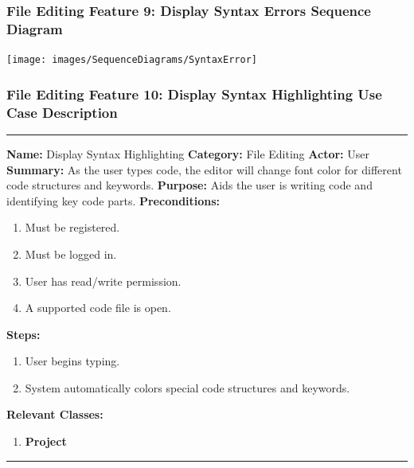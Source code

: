 \documentclass[twoside,letterpaper]{article}
\begin{document}
\subsubsection[File Editing Feature 9: Display Syntax Errors Sequence Diagram]{\rmfamily\bfseries\color{black}
	File Editing Feature 9: Display Syntax Errors Sequence Diagram}
\hypertarget{RefHeading22059017292}{}

\bigskip

\texttt{[image: images/SequenceDiagrams/SyntaxError]}

\newpage

\subsubsection[File Editing Feature 10: Display Syntax Highlighting]{\rmfamily\bfseries\color{black}
	File Editing Feature 10: Display Syntax Highlighting Use Case Description}
\hypertarget{RefHeading22059017292}{}

\vspace{2pt}
\hrule
\vspace{8pt}
	\noindent\textbf{Name:} Display Syntax Highlighting \newline
	\noindent\textbf{Category:} File Editing \newline
	\noindent\textbf{Actor:} User \newline
	\noindent\textbf{Summary:} As the user types code, the editor will change font color for different code structures and keywords. \newline
	\noindent\textbf{Purpose:} Aids the user is writing code and identifying key code parts. \newline
	\noindent\textbf{Preconditions:}
	\begin{enumerate}
		\item Must be registered.
		\item Must be logged in.
		\item User has read/write permission.
		\item A supported code file is open.
	\end{enumerate}
	\noindent\textbf{Steps:}
	\begin{enumerate}
		\item User begins typing.
		\item System automatically colors special code structures and keywords.
	\end{enumerate}
	\noindent\textbf{Relevant Classes:}
	\begin{enumerate}
	    \item \textbf {Project}
	\end{enumerate}
\vspace{8pt}
\hrule
\newpage
\end{document}
